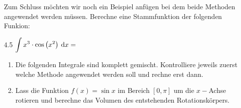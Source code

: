 	\begin{beispiel}
		Zum Schluss möchten wir noch ein Beispiel anfügen bei dem beide Methoden angewendet werden müssen. Berechne eine Stammfunktion der folgenden Funkion:
		\begin{gridspace}{4.5}
			\vspace{-1.5mm}
			$\ds\int x^3\*\cos{x^2}\d{x}=$
		\end{gridspace}
	\end{beispiel}
	\begin{aufgabe}
		\begin{enumerate}
			\item Die folgenden Integrale sind komplett gemischt. Kontrolliere jeweils zuerst welche Methode angewendet werden soll und rechne erst dann.
			\item Lass die Funktion $f(x)=\sin{x}$ im Bereich $\left[0,\pi\right]$ um die $x-$Achse rotieren und berechne das Volumen des entstehenden Rotationskörpers.
		\end{enumerate}
	\end{aufgabe}


